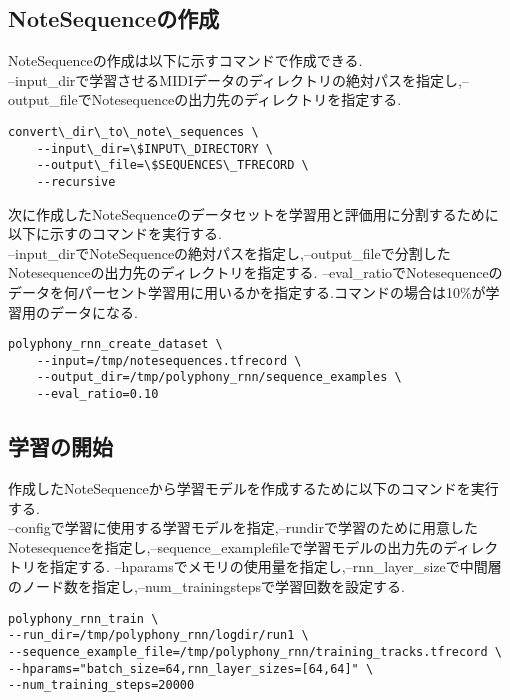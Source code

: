 \subsection{NoteSequenceの作成}
NoteSequenceの作成は以下に示すコマンドで作成できる.\\
--input\_dirで学習させるMIDIデータのディレクトリの絶対パスを指定し,--output\_fileでNotesequenceの出力先のディレクトリを指定する.\\
\begin{lstlisting}[basicstyle=\ttfamily\footnotesize,frame=single]
    convert\_dir\_to\_note\_sequences \
    --input\_dir=\$INPUT\_DIRECTORY \
    --output\_file=\$SEQUENCES\_TFRECORD \
    --recursive
\end{lstlisting}
次に作成したNoteSequenceのデータセットを学習用と評価用に分割するために以下に示すのコマンドを実行する.\\
--input\_dirでNoteSequenceの絶対パスを指定し,--output\_fileで分割したNotesequenceの出力先のディレクトリを指定する.
--eval\_ratioでNotesequenceのデータを何パーセント学習用に用いるかを指定する.コマンドの場合は10\%が学習用のデータになる.
\begin{lstlisting}[basicstyle=\ttfamily\footnotesize,frame=single]
    polyphony_rnn_create_dataset \
    --input=/tmp/notesequences.tfrecord \
    --output_dir=/tmp/polyphony_rnn/sequence_examples \
    --eval_ratio=0.10
    \end{lstlisting}
\subsection{学習の開始}
作成したNoteSequenceから学習モデルを作成するために以下のコマンドを実行する.\\
--configで学習に使用する学習モデルを指定,--rundirで学習のために用意したNotesequenceを指定し,--sequence\_examplefileで学習モデルの出力先のディレクトリを指定する.
--hparamsでメモリの使用量を指定し,--rnn\_layer\_sizeで中間層のノード数を指定し,--num\_trainingstepsで学習回数を設定する.\\
\begin{lstlisting}[basicstyle=\ttfamily\footnotesize,frame=single]
polyphony_rnn_train \
--run_dir=/tmp/polyphony_rnn/logdir/run1 \
--sequence_example_file=/tmp/polyphony_rnn/training_tracks.tfrecord \
--hparams="batch_size=64,rnn_layer_sizes=[64,64]" \
--num_training_steps=20000
\end{lstlisting}
